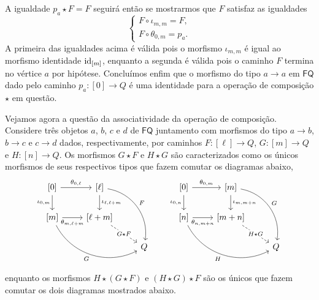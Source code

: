 A igualdade $p_a \star F = F$ seguirá então se mostrarmos que $F$ satisfaz as igualdades
\begin{displaymath}
    \begin{cases}
        F \circ \iota_{m,m} = F, \\
        F \circ \theta_{0,m} = p_a.
    \end{cases}
\end{displaymath}
A primeira das igualdades acima é válida pois o morfismo $\iota_{m,m}$ é igual ao morfismo identidade $\mathrm{id}_{[m]}$, enquanto a segunda é válida pois o caminho $F$ termina no vértice $a$ por hipótese.
Concluímos enfim que o morfismo do tipo $a \to a$ em $\mathsf{FQ}$ dado pelo caminho $p_a: [0] \to Q$ é uma identidade para a operação de composição $\star$ em questão.

Vejamos agora a questão da associatividade da operação de composição.
Considere três objetos $a$, $b$, $c$ e $d$ de $\mathsf{FQ}$ juntamento com morfismos do tipo $a \to b$, $b \to c$ e $c \to d$ dados, respectivamente, por caminhos $F: [\ell] \to Q$, $G: [m] \to Q$ e $H: [n] \to Q$.
Os morfismos $G \star F$ e $H \star G$ são caracterizados como os únicos morfismos de seus respectivos tipos que fazem comutar os diagramas abaixo,
\begin{equation}\label{eq:associatividade_cat_livre_diag_1}
    \begin{tikzcd}
        {[0]}
        \arrow[r, "{\theta_{0,\ell}}"]
        \arrow[d, "{\iota_{0,m}}" swap]
        & {[\ell]}
        \arrow[d, "{\iota_{\ell,\ell+m}}"]
        \arrow[rdd, bend left=45, "F"]
        \\ {[m]}
        \arrow[r, "{\theta_{m,\ell+m}}" swap]
        \arrow[rrd, bend right=45, "G" swap]
        & {[\ell+m]}
        \arrow[rd, dashed, "G \star F" description]
        \\ & & Q
    \end{tikzcd}
    \qquad
    \begin{tikzcd}
        {[0]}
        \arrow[r, "{\theta_{0,m}}"]
        \arrow[d, "{\iota_{0,n}}" swap]
        & {[m]}
        \arrow[d, "{\iota_{m,m+n}}"]
        \arrow[rdd, bend left=45, "G"]
        \\ {[n]}
        \arrow[r, "{\theta_{n,m+n}}" swap]
        \arrow[rrd, bend right=45, "H" swap]
        & {[m+n]}
        \arrow[rd, dashed, "H \star G" description]
        \\ & & Q
    \end{tikzcd}
\end{equation}
enquanto os morfismos $H \star (G \star F)$ e $(H \star G) \star F$ são os únicos que fazem comutar os dois diagramas mostrados abaixo.
